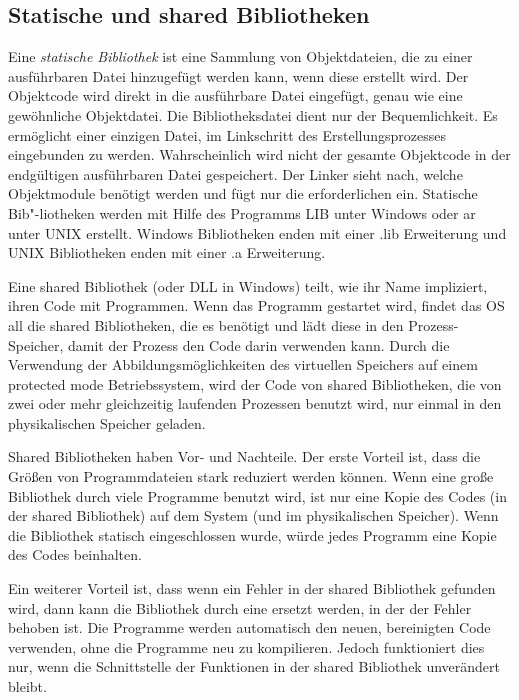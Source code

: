 \subsection{Statische und shared Bibliotheken}

 Eine \emph{statische Bibliothek} ist
eine Sammlung von Objektdateien, die zu einer ausf\"{u}hrbaren Datei
hinzugef\"{u}gt werden kann, wenn diese erstellt wird. Der Objektcode
wird direkt in die ausf\"{u}hrbare Datei eingef\"{u}gt, genau wie eine
gew\"{o}hnliche Objektdatei. Die Bibliotheksdatei dient nur der
Bequemlichkeit. Es erm\"{o}glicht einer einzigen Datei, im Linkschritt
des Erstellungsprozesses eingebunden zu werden. Wahrscheinlich wird
nicht der gesamte Objektcode in der endg\"{u}ltigen ausf\"{u}hrbaren Datei
gespeichert. Der Linker sieht nach, welche Objektmodule ben\"{o}tigt
werden und f\"{u}gt nur die erforderlichen ein. Statische Bib"-liotheken
werden mit Hilfe des Programms {\code LIB} unter Windows oder {\code
ar} unter UNIX erstellt. Windows Bibliotheken enden mit einer {\code
.lib} Erweiterung und UNIX Bibliotheken enden mit einer {\code .a}
Erweiterung. 

 Eine shared Bibliothek (oder DLL in
Windows) teilt, wie ihr Name impliziert, ihren Code mit Programmen.
Wenn das Programm gestartet wird, findet das OS all die shared
Bibliotheken, die es ben\"{o}tigt und l\"{a}dt diese in den
Prozess-Speicher, damit der Prozess den Code da\-rin verwenden kann.
Durch die Verwendung der Abbildungsm\"{o}glichkeiten des virtuellen
Speichers auf einem protected mode Betriebssystem, wird der Code von
shared Bibliotheken, die von zwei oder mehr gleichzeitig laufenden
Prozessen benutzt wird, nur einmal in den physikalischen Speicher
geladen.

Shared Bibliotheken haben Vor- und Nachteile. Der erste Vorteil ist,
dass die Gr\"{o}{\ss}en von Programmdateien stark reduziert werden k\"{o}nnen.
Wenn eine gro{\ss}e Bibliothek durch viele Programme benutzt wird, ist
nur eine Kopie des Codes (in der shared Bibliothek) auf dem System
(und im physikalischen Speicher). Wenn die Bibliothek statisch
eingeschlossen wurde, w\"{u}rde jedes Programm eine Kopie des Codes
beinhalten.

Ein weiterer Vorteil ist, dass wenn ein Fehler in der shared
Bibliothek gefunden wird, dann kann die Bibliothek durch eine
ersetzt werden, in der der Fehler behoben ist. Die Programme werden
automatisch den neuen, bereinigten Code verwenden, ohne die
Programme neu zu kompilieren. Jedoch funktioniert dies nur, wenn die
Schnittstelle der Funktionen in der shared Bibliothek unver\"{a}ndert
bleibt.

